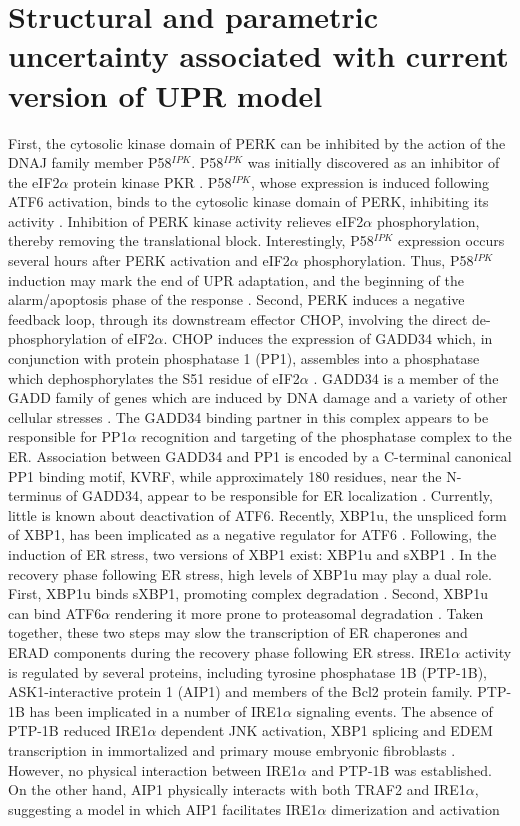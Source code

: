 \documentclass[fleqn,10pt]{wlscirep}
\begin{document}
\section*{Structural and parametric uncertainty associated with current version of UPR model}
First, the cytosolic kinase domain of PERK can be inhibited by the action of the DNAJ family member P58$^{IPK}$. P58$^{IPK}$ was initially discovered as an inhibitor of the eIF2$\alpha$ protein kinase PKR \cite{Lee:1990ye}. P58$^{IPK}$, whose expression is induced following ATF6 activation, binds to the cytosolic kinase domain of PERK, inhibiting its activity \cite{Yan:2002fk,Huizen:2003qo}. Inhibition of PERK kinase activity relieves eIF2$\alpha$ phosphorylation, thereby removing the translational block. Interestingly, P58$^{IPK}$ expression occurs several hours after PERK activation and eIF2$\alpha$ phosphorylation. Thus, P58$^{IPK}$ induction may mark the end of UPR adaptation, and the beginning of the alarm/apoptosis phase of the response \cite{szegezdi2006mediators}. Second, PERK induces a negative feedback loop, through its downstream effector CHOP, involving the direct de-phosphorylation of eIF2$\alpha$. CHOP induces the expression of GADD34 which, in conjunction with protein phosphatase 1 (PP1), assembles into a phosphatase which dephosphorylates the S51 residue of eIF2$\alpha$ \cite{Novoa:2001mb}. GADD34 is a member of the GADD family of genes which are induced by DNA damage and a variety of other cellular stresses \cite{Zhan:1994cq}. The GADD34 binding partner in this complex appears to be responsible for PP1$\alpha$ recognition and targeting of the phosphatase complex to the ER. Association between GADD34 and PP1 is encoded by a C-terminal canonical PP1 binding motif, KVRF, while approximately 180 residues, near the N-terminus of GADD34, appear to be responsible for ER localization \cite{Brush:2003kh}. Currently, little is known about deactivation of ATF6. Recently, XBP1u, the unspliced form of XBP1, has been implicated as a negative regulator for ATF6 \cite{Yoshida:2009bs}. Following, the induction of ER stress, two versions of XBP1 exist: XBP1u and sXBP1 \cite{Yoshida:2009bs}. In the recovery phase following ER stress, high levels of XBP1u may play a dual role. First, XBP1u binds sXBP1, promoting complex degradation \cite{Yoshida:2006dz, Tirosh:2006fv}. Second, XBP1u can bind ATF6$\alpha$ rendering it more prone to proteasomal degradation \cite{Yoshida:2009bs}. Taken together, these two steps may slow the transcription of ER chaperones and ERAD components during the recovery phase following ER stress. IRE1$\alpha$ activity is regulated by several proteins, including tyrosine phosphatase 1B (PTP-1B), ASK1-interactive protein 1 (AIP1) and members of the Bcl2 protein family. PTP-1B has been implicated in a number of IRE1$\alpha$ signaling events. The absence of PTP-1B reduced IRE1$\alpha$ dependent JNK activation, XBP1 splicing and EDEM transcription in immortalized and primary mouse embryonic fibroblasts \cite{Gu:2004kx}. However, no physical interaction between IRE1$\alpha$ and PTP-1B was established. On the other hand, AIP1 physically interacts with both TRAF2 and IRE1$\alpha$, suggesting a model in which AIP1 facilitates IRE1$\alpha$ dimerization and activation 
\end{document}
